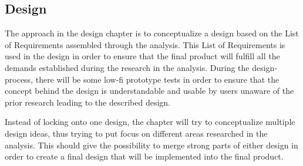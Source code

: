 \subsection{Design}
The approach in the design chapter is to conceptualize a design based on the List of Requirements assembled through the analysis. This List of Requirements is used in the design in order to ensure that the final product will fulfill all the demands established during the research in the analysis. During the design-process, there will be some low-fi prototype tests in order to ensure that the concept behind the design is understandable and usable by users unaware of the prior research leading to the described design.
 
Instead of locking onto one design, the chapter will try to conceptualize multiple design ideas, thus trying to put focus on different areas researched in the analysis. This should give the possibility to merge strong parts of either design in order to create a final design that will be implemented into the final product.
